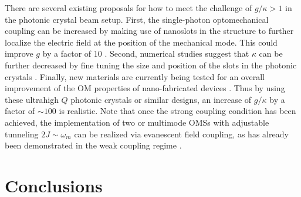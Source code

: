 There are several existing
proposals for how to meet the challenge
of $g/\kappa > 1$ 
in the photonic crystal beam setup.
First, 
the single-photon optomechanical coupling can 
be increased by making use of
nanoslots in the structure \cite{Robinson2005, Davanc2012} 
to further localize the electric field at 
the position of the mechanical mode.
This could improve $g$ by a factor of 10
\cite{Ludwig2012}.
Second, numerical studies 
suggest that $\kappa$ can be further decreased
by fine tuning the size and position of the slots in
the photonic crystals \cite{Notomi2008,Tanaka2008}. 
Finally, new materials are currently being tested for an 
overall improvement of the OM properties of nano-fabricated devices
\cite{Xiong2012}.
Thus by using these ultrahigh $Q$ photonic crystals or 
similar designs, an increase of $g/\kappa$ by a factor of $\sim 100$ 
is realistic. 
Note that once the strong coupling condition has been achieved, 
the implementation of two or multimode OMSs 
with adjustable tunneling $2J\sim \omega_m$ can be realized via evanescent field
coupling, as has already been demonstrated in the weak coupling regime
\cite{Safavi-Naeini2011a, Eichenfield2009, Grudinin2010}.






\section{Conclusions}
\label{sect:Conclusion}

